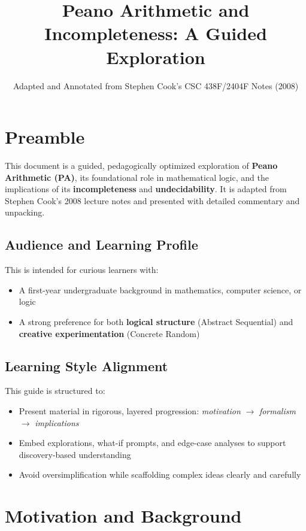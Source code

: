 \documentclass[12pt]{article}
\title{Peano Arithmetic and Incompleteness: A Guided Exploration}
\author{Adapted and Annotated from Stephen Cook's CSC 438F/2404F Notes (2008)}
\date{}
\begin{document}
\maketitle

\tableofcontents

\section*{Preamble}

This document is a guided, pedagogically optimized exploration of \textbf{Peano Arithmetic (PA)}, its foundational role in mathematical logic, and the implications of its \textbf{incompleteness} and \textbf{undecidability}. It is adapted from Stephen Cook's 2008 lecture notes and presented with detailed commentary and unpacking.

\subsection*{Audience and Learning Profile}
This is intended for curious learners with:
\begin{itemize}
  \item A first-year undergraduate background in mathematics, computer science, or logic
  \item A strong preference for both \textbf{logical structure} (Abstract Sequential) and \textbf{creative experimentation} (Concrete Random)
\end{itemize}

\subsection*{Learning Style Alignment}
This guide is structured to:
\begin{itemize}
  \item Present material in rigorous, layered progression: \textit{motivation} $\rightarrow$ \textit{formalism} $\rightarrow$ \textit{implications}
  \item Embed explorations, what-if prompts, and edge-case analyses to support discovery-based understanding
  \item Avoid oversimplification while scaffolding complex ideas clearly and carefully
\end{itemize}

\vspace{1em}

\section{Motivation and Background}
\end{document}

